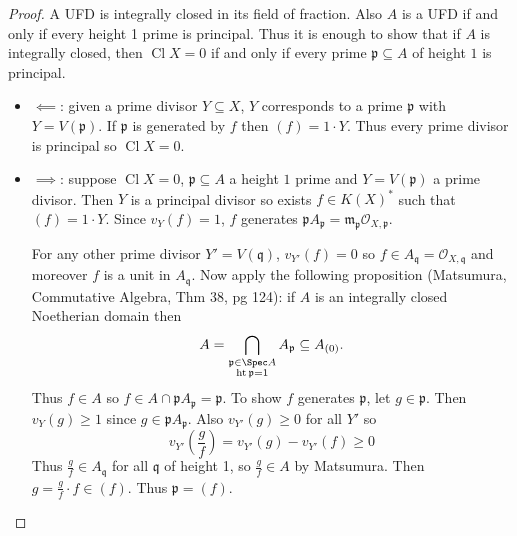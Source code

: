\documentclass[a4paper]{article}
\newcommand{\sh}[1]{\mathcal{#1}} %
\DeclareMathOperator{\Cl}{Cl} %
\begin{document}
\begin{proof}
  A UFD is integrally closed in its field of fraction. Also \(A\) is a UFD if and only if every height 1 prime is principal. Thus it is enough to show that if \(A\) is integrally closed, then \(\Cl X = 0\) if and only if every prime \(\mathfrak p \subseteq A\) of height \(1\) is principal.
  \begin{itemize}
  \item \(\impliedby\): given a prime divisor \(Y \subseteq X\), \(Y\) corresponds to a prime \(\mathfrak p\) with \(Y = V(\mathfrak p)\). If \(\mathfrak p\) is generated by \(f\) then \((f) = 1 \cdot Y\). Thus every prime divisor is principal so \(\Cl X = 0\).
  \item \(\implies\): suppose \(\Cl X = 0\), \(\mathfrak p \subseteq A\) a height \(1\) prime and \(Y = V(\mathfrak p)\) a prime divisor. Then \(Y\) is a principal divisor so exists \(f \in K(X)^*\) such that \((f) = 1 \cdot Y\). Since \(v_Y(f) = 1\), \(f\) generates \(\mathfrak p A_{\mathfrak p} = \mathfrak m_{\mathfrak p} \sh O_{X, \mathfrak p}\).

    For any other prime divisor \(Y' = V(\mathfrak q)\), \(v_{Y'}(f) = 0\) so \(f \in A_{\mathfrak q} = \sh O_{X, \mathfrak q}\) and moreover \(f\) is a unit in \(A_{\mathfrak q}\). Now apply the following proposition (Matsumura, Commutative Algebra, Thm 38, pg 124): if \(A\) is an integrally closed Noetherian domain then
    \[
      A = \bigcap_{\substack{\mathfrak p \in \Spec A \\ \operatorname{ht} \mathfrak p = 1}} A_{\mathfrak p} \subseteq A_{(0)}.
    \]
    Thus \(f \in A\) so \(f \in A \cap \mathfrak p A_{\mathfrak p} = \mathfrak p\). To show \(f\) generates \(\mathfrak p\), let \(g \in \mathfrak p\). Then \(v_Y(g) \geq 1\) since \(g \in \mathfrak p A_{\mathfrak p}\). Also \(v_{Y'}(g) \geq 0\) for all \(Y'\) so
    \[
      v_{Y'}(\frac{g}{f}) = v_{Y'}(g) - v_{Y'}(f) \geq 0
    \]
    Thus \(\frac{g}{f} \in A_{\mathfrak q}\) for all \(\mathfrak q\) of height 1, so \(\frac{g}{f} \in A\) by Matsumura. Then \(g = \frac{g}{f} \cdot f \in (f)\). Thus \(\mathfrak p = (f)\).
  \end{itemize}
\end{proof}
\end{document}
